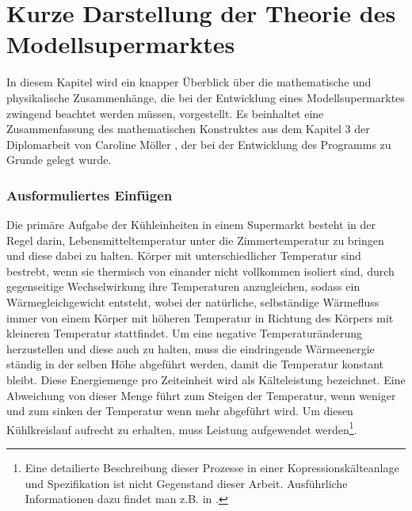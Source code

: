 \chapter{Kurze Darstellung der Theorie des Modellsupermarktes}
\label{chap:theorie}
\minitoc
In diesem Kapitel wird ein knapper Überblick über die mathematische und physikalische Zusammenhänge, die bei der Entwicklung eines
Modellsupermarktes zwingend beachtet werden müssen, vorgestellt. Es beinhaltet eine
Zusammenfassung des mathematischen Konstruktes aus dem Kapitel 3 der Diplomarbeit von Caroline Möller \cite{caro}, der bei der
Entwicklung des Programms zu Grunde gelegt wurde.

\subsection{Ausformuliertes Einfügen}

Die primäre Aufgabe der Kühleinheiten in einem Supermarkt besteht in der Regel darin, Lebensmitteltemperatur unter die
Zimmertemperatur zu bringen und diese dabei zu halten. Körper mit unterschiedlicher Temperatur sind bestrebt, wenn sie
thermisch von einander nicht vollkommen isoliert sind, durch gegenseitige Wechselwirkung ihre Temperaturen anzugleichen,
sodass ein Wärmegleichgewicht entsteht, wobei der natürliche, selbständige Wärmefluss immer von einem Körper mit höheren
Temperatur in Richtung des Körpers mit kleineren Temperatur stattfindet. Um eine negative Temperaturänderung herzustellen und
diese auch zu halten, muss die eindringende Wärmeenergie ständig in der selben Höhe abgeführt werden, damit die Temperatur
konstant bleibt. Diese Energiemenge pro Zeiteinheit wird als Kälteleistung bezeichnet. Eine Abweichung von dieser Menge führt
zum Steigen der Temperatur, wenn weniger und zum sinken der Temperatur wenn mehr abgeführt wird. Um diesen Kühlkreislauf
aufrecht zu erhalten, muss Leistung aufgewendet werden\footnote{ Eine detailierte Beschreibung dieser Prozesse in einer
Kopressionskälteanlage und Spezifikation ist nicht Gegenstand dieser Arbeit. Ausführliche Informationen dazu findet man z.B.
in \cite{caro, doctor, TAB_A1}.}.

